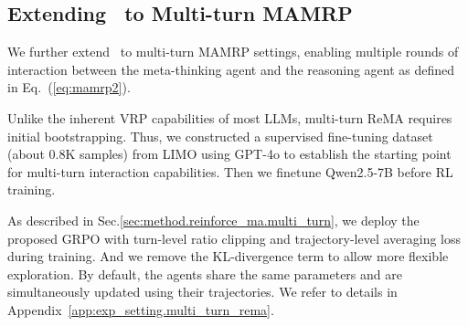 \subsection{Extending \method~to Multi-turn MAMRP}
\label{sec:exp.multiturn}

We further extend \method~to multi-turn MAMRP settings, enabling multiple rounds of interaction between the meta-thinking agent and the reasoning agent as defined in Eq.~(\ref{eq:mamrp2}).

Unlike the inherent VRP capabilities of most LLMs, multi-turn ReMA requires initial bootstrapping. 
Thus, we constructed a supervised fine-tuning dataset (about 0.8K samples) from LIMO \citep{ye2025limo} using GPT-4o to establish the starting point for multi-turn interaction capabilities. Then we finetune Qwen2.5-7B before RL training. 

As described in Sec.\ref{sec:method.reinforce_ma.multi_turn}, we deploy the proposed GRPO with turn-level ratio clipping and trajectory-level averaging loss during training. 
And we remove the KL-divergence term to allow more flexible exploration.
By default, the agents share the same parameters and are simultaneously updated using their trajectories. We refer to details in Appendix~\ref{app:exp_setting.multi_turn_rema}.

